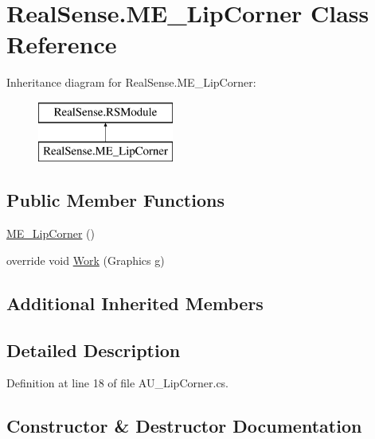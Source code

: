 \hypertarget{class_real_sense_1_1_m_e___lip_corner}{}\section{Real\+Sense.\+M\+E\+\_\+\+Lip\+Corner Class Reference}
\label{class_real_sense_1_1_m_e___lip_corner}
Inheritance diagram for Real\+Sense.\+M\+E\+\_\+\+Lip\+Corner\+:\begin{figure}[H]
\begin{center}
\leavevmode
\includegraphics[height=2.000000cm]{class_real_sense_1_1_m_e___lip_corner}
\end{center}
\end{figure}
\subsection*{Public Member Functions}
\begin{DoxyCompactItemize}
\item 
\hyperlink{class_real_sense_1_1_m_e___lip_corner_a52ab3e662adc0b1103a60ab3a73e5bf2}{M\+E\+\_\+\+Lip\+Corner} ()
\item 
override void \hyperlink{class_real_sense_1_1_m_e___lip_corner_a06291f1d061a61b66211d3165f3a44b7}{Work} (Graphics g)
\end{DoxyCompactItemize}
\subsection*{Additional Inherited Members}


\subsection{Detailed Description}


Definition at line 18 of file A\+U\+\_\+\+Lip\+Corner.\+cs.



\subsection{Constructor \& Destructor Documentation}
\mbox{\label{class_real_sense_1_1_m_e___lip_corner_a52ab3e662adc0b1103a60ab3a73e5bf2}} 
